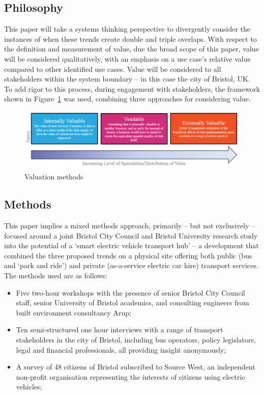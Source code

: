 \documentclass[journal]{IEEEtran}
\begin{document}
\subsection{Philosophy}

This paper will take a systems thinking perspective to divergently
consider the instances of when these trends create double and triple
overlaps. With respect to the definition and measurement of value, due
the broad scope of this paper, value will be considered qualitatively,
with an emphasis on a use case's relative value compared to other
identified use cases. Value will be considered to all stakeholders
within the system boundary -- in this case the city of Bristol, UK. To
add rigor to this process, during engagement with stakeholders, the
framework shown in Figure~\ref{fig:valuationmethods} was used,
combining three approaches for considering value.

\begin{figure}[!htb]
\centering
\includegraphics[width=\columnwidth]{images/valuationmethods.png}
\caption{Valuation methods}
\label{fig:valuationmethods}
\end{figure}


\subsection{Methods}

This paper implies a mixed methods approach, primarily – but not
exclusively -- focused around a joint Bristol City Council and Bristol
University research study into the potential of a `smart electric
vehicle transport hub' -- a development that combined the three
proposed trends on a physical site offering both public (bus and `park
and ride') and private (as-a-service electric car hire) transport
services. The methods used are as follows:

\begin{itemize}
\item Five two-hour workshops with the presence of senior Bristol City
Council staff, senior University of Bristol academics, and consulting
engineers from built environment consultancy Arup;
\item Ten semi-structured one hour interviews with a range of
transport stakeholders in the city of Bristol, including bus
operators, policy legislators, legal and financial professionals, all
providing insight anonymously;
\item A survey of 48 citizens of Bristol subscribed to Source West, an
independent non-profit organisation representing the interests of
citizens using electric vehicles;
\end{itemize}
\end{document}
